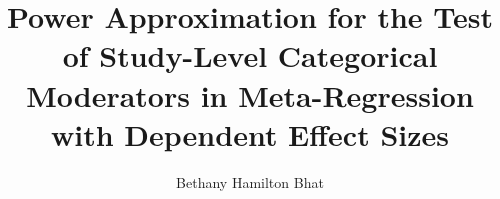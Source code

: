\author{Bethany Hamilton Bhat  }  	%

\address{bethanyhamilton@utexas.edu}  %

\title{Power Approximation for the Test of Study-Level Categorical Moderators in Meta-Regression with Dependent Effect Sizes} %


%
%
%
%
%
%

%
%
%
%
%
%


